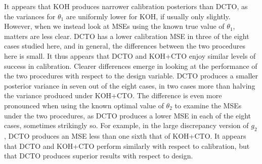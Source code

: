 \documentclass[12pt]{article}
\begin{document}
%
It appears that KOH produces narrower calibration posteriors than DCTO, as the variances for $\theta_1$ are uniformly lower for KOH, if usually only slightly.
%
However, when we instead look at MSEs using the known true value of $\theta_1$, matters are less clear.
%
DCTO has a lower calibration MSE in three of the eight cases studied here, and in general, the differences between the two procedures here is small.
%
It thus appears that DCTO and KOH+CTO enjoy similar levels of success in calibration.
%
Clearer differences emerge in looking at the performance of the two procedures with respect to the design variable.
%
DCTO produces a smaller posterior variance in seven out of the eight cases, in two cases more than halving the variance produced under KOH+CTO.
%
The difference is even more pronounced when using the known optimal value of $\theta_2$ to examine the MSEs under the two procedures, as DCTO produces a lower MSE in each of the eight cases, sometimes strikingly so.
%
For example, in the large discrepancy version of $g_2$, DCTO produces an MSE less than one sixth that of KOH+CTO.
%
It appears that DCTO and KOH+CTO perform similarly with respect to calibration, but that DCTO produces superior results with respect to design.
%
\end{document}
